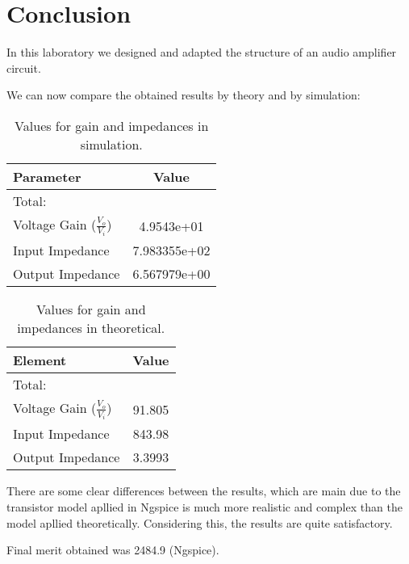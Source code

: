 \newpage
\section{Conclusion}
\label{sec:conclusion}

In this laboratory we designed and adapted the structure of an audio amplifier circuit.

We can now compare the obtained results by theory and by simulation:

\begin{table}[h]
    \centering
    \begin{tabular}{|l|c|}
    \hline
    {\bf Parameter} & {\bf Value} \\ 
    \hline\hline
    Total: & \\ \hline
      Voltage Gain ($\frac{V_{o}}{V_{i}}$)  &  4.9543e+01 \\
    \hline
    Input Impedance & 7.983355e+02 \\
    \hline
    Output Impedance & 6.567979e+00 \\\hline
    \end{tabular}
    \caption{Values for gain and impedances in simulation.}
    \label{tab:values}
\end{table}

\begin{table}[h]
    \centering
    \begin{tabular}{|l|c|}
    \hline
    {\bf Element } & {\bf Value} \\
    \hline \hline
    Total: & \\ \hline
    Voltage Gain ($\frac{V_{o}}{V_{i}}$)  & 91.805 \\ \hline
    Input Impedance & 843.98 \\ \hline
    Output Impedance  & 3.3993 \\ \hline
    \end{tabular}
    \caption{Values for gain and impedances in theoretical.}
    \label{tab:sim1}
\end{table}

There are some clear differences between the results, which are main due to the transistor model apllied in Ngspice is much more realistic and complex than the model apllied theoretically. Considering this, the results are quite satisfactory.

Final merit obtained was 2484.9 (Ngspice). 

